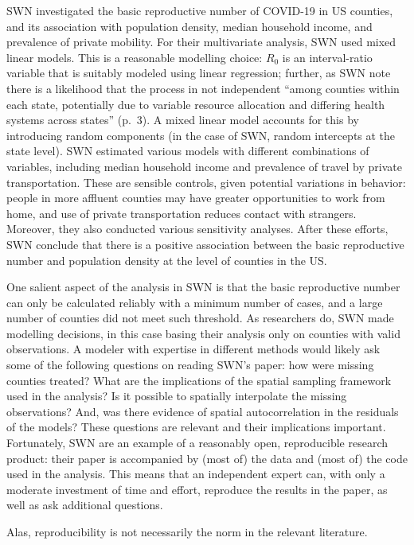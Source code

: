 \documentclass[10pt,letterpaper]{article}
\begin{document}
SWN investigated the basic reproductive number of COVID-19 in US
counties, and its association with population density, median household
income, and prevalence of private mobility. For their multivariate
analysis, SWN used mixed linear models. This is a reasonable modelling
choice: \(R_0\) is an interval-ratio variable that is suitably modeled
using linear regression; further, as SWN note there is a likelihood that
the process in not independent ``among counties within each state,
potentially due to variable resource allocation and differing health
systems across states'' (p.~3). A mixed linear model accounts for this
by introducing random components (in the case of SWN, random intercepts
at the state level). SWN estimated various models with different
combinations of variables, including median household income and
prevalence of travel by private transportation. These are sensible
controls, given potential variations in behavior: people in more
affluent counties may have greater opportunities to work from home, and
use of private transportation reduces contact with strangers. Moreover,
they also conducted various sensitivity analyses. After these efforts,
SWN conclude that there is a positive association between the basic
reproductive number and population density at the level of counties in
the US.

One salient aspect of the analysis in SWN is that the basic reproductive
number can only be calculated reliably with a minimum number of cases,
and a large number of counties did not meet such threshold. As
researchers do, SWN made modelling decisions, in this case basing their
analysis only on counties with valid observations. A modeler with
expertise in different methods would likely ask some of the following
questions on reading SWN's paper: how were missing counties treated?
What are the implications of the spatial sampling framework used in the
analysis? Is it possible to spatially interpolate the missing
observations? And, was there evidence of spatial autocorrelation in the
residuals of the models? These questions are relevant and their
implications important. Fortunately, SWN are an example of a reasonably
open, reproducible research product: their paper is accompanied by (most
of) the data and (most of) the code used in the analysis. This means
that an independent expert can, with only a moderate investment of time
and effort, reproduce the results in the paper, as well as ask
additional questions.

Alas, reproducibility is not necessarily the norm in the relevant
literature.
\end{document}
